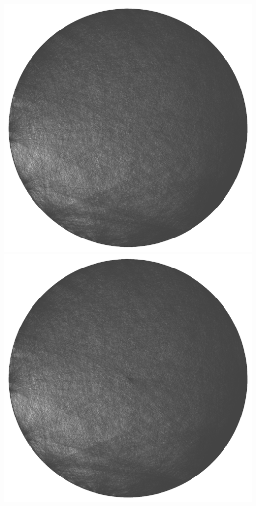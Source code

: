 \documentclass[12pt, a4paper]{article}
\begin{document}
\begin{multicols}{2}
  {\centering
  \includegraphics[width=\columnwidth]{src/youtube/hdg/comp/1_plot_crc}\\
  \label{fig:hdg_c1}}
  {\centering
  \includegraphics[width=\columnwidth]{src/youtube/hdg/comp/2_plot_str}\\
  \label{fig:hdg_c2}}
\end{multicols}
\end{document}
